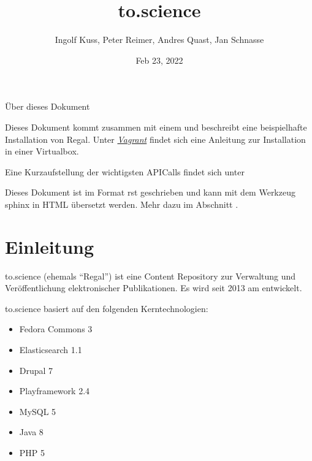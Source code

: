 \documentclass[letterpaper,10pt,english]{sphinxmanual}
\title{to.science}
\date{Feb 23, 2022}
\author{Ingolf Kuss, Peter Reimer, Andres Quast, Jan Schnasse}
\begin{document}
\pagestyle{empty}
\sphinxmaketitle
\pagestyle{plain}
\sphinxtableofcontents
\pagestyle{normal}
\label{\detokenize{index::doc}}


\sphinxAtStartPar
Über dieses Dokument

\sphinxAtStartPar
Dieses Dokument kommt zusammen mit einem
und beschreibt eine beispielhafte Installation von Regal. Unter
{\hyperref[\detokenize{index:_vagrant}]{\emph{Vagrant}}} findet sich eine Anleitung zur Installation in
einer Virtualbox.

\sphinxAtStartPar
Eine Kurzaufstellung der wichtigsten API\sphinxhyphen{}Calls findet sich unter

\sphinxAtStartPar
Dieses Dokument ist im Format rst geschrieben und kann mit dem
Werkzeug sphinx in HTML übersetzt werden. Mehr dazu im Abschnitt
{\hyperref[\detokenize{colophon:dokumentation}]{}}.


\chapter{Einleitung}
\label{\detokenize{toscience:einleitung}}\label{\detokenize{toscience:id1}}\label{\detokenize{toscience::doc}}
\sphinxAtStartPar
to.science (ehemals “Regal”) ist eine Content Repository zur Verwaltung
und Veröffentlichung elektronischer Publikationen. Es wird seit 2013 am
entwickelt.

\sphinxAtStartPar
to.science basiert auf den folgenden Kerntechnologien:
\begin{itemize}
\item {} 
\sphinxAtStartPar
Fedora Commons 3

\item {} 
\sphinxAtStartPar
Elasticsearch 1.1

\item {} 
\sphinxAtStartPar
Drupal 7

\item {} 
\sphinxAtStartPar
Playframework 2.4

\item {} 
\sphinxAtStartPar
MySQL 5

\item {} 
\sphinxAtStartPar
Java 8

\item {} 
\sphinxAtStartPar
PHP 5

\end{itemize}
\end{document}

